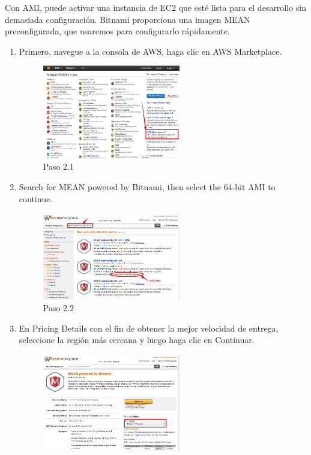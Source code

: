 \begin{itemize}
    Con AMI, puede activar una instancia de EC2 que esté lista para el desarrollo sin demasiada configuración. Bitnami proporciona una imagen MEAN preconfigurada, que usaremos para configurarlo rápidamente.
    
    \begin{enumerate}
    \item Primero, navegue a la consola de AWS, haga clic en AWS Marketplace.
    \begin{figure}[H]
    \centering
    \includegraphics[width=60mm]{memoria/LaTeX/img/despliegue/paso2_1.png}
    \caption{Paso 2.1}
    \end{figure}
    \item Search for MEAN powered by Bitnami, then select the 64-bit AMI to continue.
    \begin{figure}[H]
    \centering
    \includegraphics[width=60mm]{memoria/LaTeX/img/despliegue/paso2_2.png}
    \caption{Paso 2.2}
    \end{figure}
    \item En Pricing Details con el fin de obtener la mejor velocidad de entrega, seleccione la región más cercana y luego haga clic en Continuar.
    \begin{figure}[H]
    \centering
    \includegraphics[width=60mm]{memoria/LaTeX/img/despliegue/paso2_3.png}

\end{figure}
\end{enumerate}
\end{itemize}

